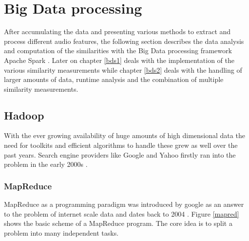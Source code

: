 
\section{Big Data processing}\label{bdf}

After accumulating the data and presenting various methods to extract and process different audio features, the following section describes the data analysis and computation of the similarities with the Big Data processing framework Apache Spark \cite{spark}. Later on chapter \ref{bds1} deals with the implementation of the various similarity measurements while chapter \ref{bds2} deals with the handling of larger amounts of data, runtime analysis and the combination of multiple similarity measurements.

\subsection{Hadoop}

With the ever growing availability of huge amounts of high dimensional data the need for toolkits and efficient algorithms to handle these grew as well over the past years. Search engine providers like Google and Yahoo firstly ran into the problem in the early 2000s \cite[p. 6]{sparkbook1}.

\subsubsection{MapReduce}

MapReduce as a programming paradigm was introduced by google as an answer to the problem of internet scale data and dates back to 2004 \cite{mapreduce1}. Figure \ref{mapred} shows the basic scheme of a MapReduce program. The core idea is to split a problem into many independent tasks.

